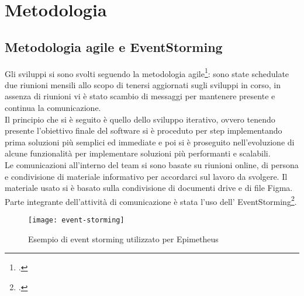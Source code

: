 \chapter{Metodologia}
\label{cap:metodologia}


\section{Metodologia agile e EventStorming}
\label{sec:metodologia-agile}

Gli sviluppi si sono svolti seguendo la metodologia agile\footcite{site:agile-manifesto}: sono state schedulate due riunioni mensili allo scopo di tenersi aggiornati sugli sviluppi in corso, in assenza di riunioni vi è stato scambio di messaggi per mantenere presente e continua la comunicazione.\\
Il principio che si è seguito è quello dello sviluppo iterativo, ovvero tenendo presente l'obiettivo finale del software si è proceduto per step implementando prima soluzioni più semplici ed immediate e poi si è proseguito nell'evoluzione di alcune funzionalità per implementare soluzioni più performanti e scalabili. \\

Le comunicazioni all'interno del team si sono basate su riunioni online, di persona e condivisione di materiale informativo per accordarci sul lavoro da svolgere. Il materiale usato si è basato sulla condivisione di documenti drive e di file Figma. \\
Parte integrante dell'attività di comunicazione è stata l'uso dell' EventStorming\footcite{womak:event-storming}.\\

\begin{figure}[!ht] 
    \centering 
    \texttt{[image: event-storming]} 
    \caption{Esempio di event storming utilizzato per Epimetheus}
\end{figure}


